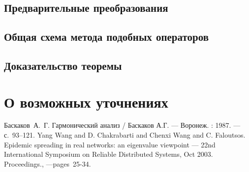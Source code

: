 \documentclass{article}
\theoremstyle{definition}
\theoremstyle{plain}
\theoremstyle{remark}
\begin{document}
\subsection{Предварительные преобразования}


\clearpage
\subsection{Общая схема метода подобных операторов}

\subsection{Доказательство теоремы}

\section{О возможных уточнениях}


\begin{thebibliography}{9}
  Баскаков~А.~Г. Гармонический анализ / Баскаков А.Г.  --- Воронеж. :  1987. ---  с.~93--121.
  Yang Wang and D. Chakrabarti and Chenxi Wang and C. Faloutsos.
    Epidemic spreading in real networks: an eigenvalue viewpoint
        --- 22nd International Symposium on Reliable Distributed Systems, Oct 2003. Proceedings., ---pages~25-34.
\end{thebibliography}
\end{document}
